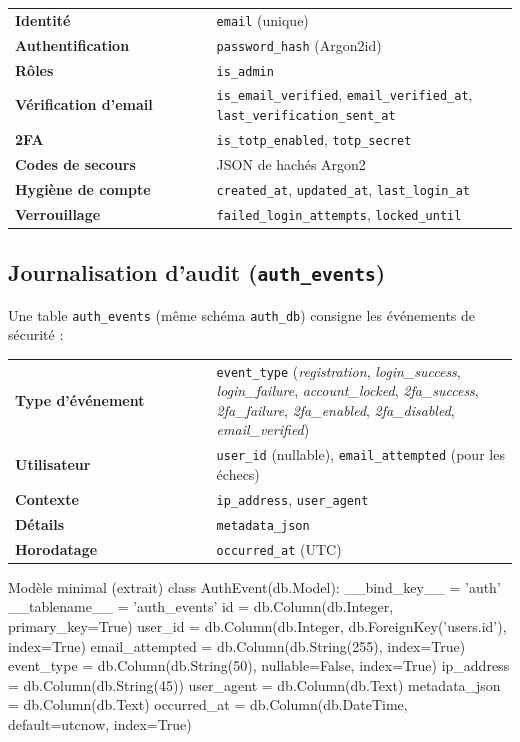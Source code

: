 \begin{itemize}
\noindent\begin{tabular}{@{}p{0.40\linewidth}p{0.60\linewidth}@{}}
\textbf{Identité} & \texttt{email} (unique) \\
\textbf{Authentification} & \texttt{password\_hash} (Argon2id) \\
\textbf{Rôles} & \texttt{is\_admin} \\
\textbf{Vérification d'email} & \texttt{is\_email\_verified}, \texttt{email\_verified\_at}, \texttt{last\_verification\_sent\_at} \\
\textbf{2FA} & \texttt{is\_totp\_enabled}, \texttt{totp\_secret} \\
\textbf{Codes de secours} & JSON de hachés Argon2 \\
\textbf{Hygiène de compte} & \texttt{created\_at}, \texttt{updated\_at}, \texttt{last\_login\_at} \\
\textbf{Verrouillage} & \texttt{failed\_login\_attempts}, \texttt{locked\_until} \\
\end{tabular}


\subsection*{Journalisation d'audit (\texttt{auth\_events})}
\noindent Une table \texttt{auth\_events} (même schéma \texttt{auth\_db}) consigne les événements de sécurité :

\noindent\begin{tabular}{@{}p{0.40\linewidth}p{0.60\linewidth}@{}}
\textbf{Type d'événement} & \texttt{event\_type} (\textit{registration}, \textit{login\_success}, \textit{login\_failure}, \textit{account\_locked}, \textit{2fa\_success}, \textit{2fa\_failure}, \textit{2fa\_enabled}, \textit{2fa\_disabled}, \textit{email\_verified}) \\
\textbf{Utilisateur} & \texttt{user\_id} (nullable), \texttt{email\_attempted} (pour les échecs) \\
\textbf{Contexte} & \texttt{ip\_address}, \texttt{user\_agent} \\
\textbf{Détails} & \texttt{metadata\_json} \\
\textbf{Horodatage} & \texttt{occurred\_at} (UTC) \\
\end{tabular}

\begin{codebox}[language=Python]{Modèle minimal (extrait)}
class AuthEvent(db.Model):
    __bind_key__ = 'auth'
    __tablename__ = 'auth_events'
    id = db.Column(db.Integer, primary_key=True)
    user_id = db.Column(db.Integer, db.ForeignKey('users.id'), index=True)
    email_attempted = db.Column(db.String(255), index=True)
    event_type = db.Column(db.String(50), nullable=False, index=True)
    ip_address = db.Column(db.String(45))
    user_agent = db.Column(db.Text)
    metadata_json = db.Column(db.Text)
    occurred_at = db.Column(db.DateTime, default=utcnow, index=True)
\end{codebox}


\end{itemize}
